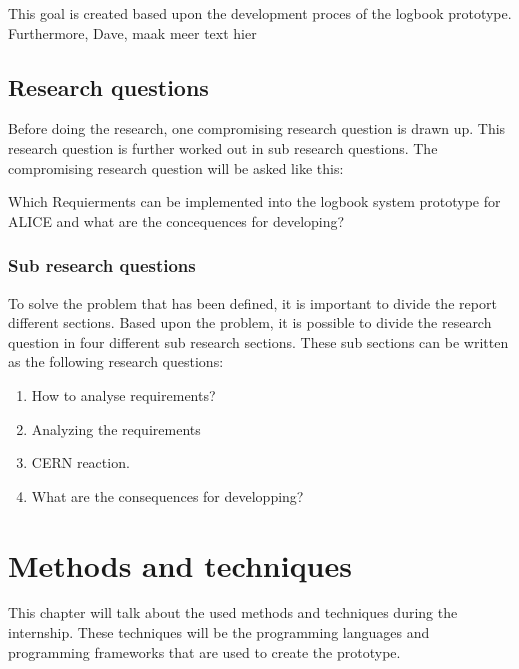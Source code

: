 \documentclass[paper=a4, fontsize=11pt,twoside]{scrartcl}	%
\begin{document}
This goal is created based upon the development proces of the logbook prototype. Furthermore, Dave, maak meer text hier 

\subsection{Research questions}
Before doing the research, one compromising research question is drawn up. This research question is further worked out in sub research questions. The compromising research question will be asked like this: 

Which Requierments can be implemented into the logbook system prototype for ALICE and what are the concequences for developing?
\subsubsection{Sub research questions}
To solve the problem that has been defined, it is important to divide the report different sections. Based upon the problem, it is possible to divide the research question in four different sub research sections. These sub sections can be written as the following research questions:  
\begin{enumerate}
\item How to analyse requirements?
\item Analyzing the requirements
\item CERN reaction.
\item What are the consequences for developping?
\end{enumerate}
% 
%
%
% 
% 
% 


 

\newpage
\section{Methods and techniques}
This chapter will talk about the used methods and techniques during the internship. These techniques will be the programming languages and programming frameworks that are used to create the prototype.
\end{document}
